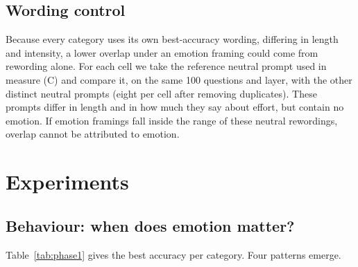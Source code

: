 \documentclass[11pt]{article}
\begin{document}
\subsection{Wording control}

Because every category uses its own best-accuracy wording, differing in length and intensity, a lower overlap under an emotion framing could come from rewording alone. For each cell we take the reference neutral prompt used in measure (C) and compare it, on the same 100 questions and layer, with the other distinct neutral prompts (eight per cell after removing duplicates). These prompts differ in length and in how much they say about effort, but contain no emotion. If emotion framings fall inside the range of these neutral rewordings, overlap cannot be attributed to emotion.

\section{Experiments}

\subsection{Behaviour: when does emotion matter?}

Table~\ref{tab:phase1} gives the best accuracy per category. Four patterns emerge.
\end{document}
